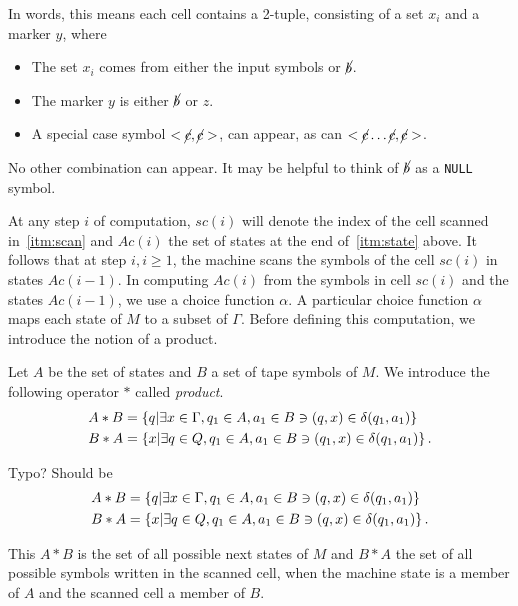 \begin{aside}
In words, this means each cell contains a 2-tuple, consisting of a set ${x_i}$ and a marker $y$, 
where
\begin{itemize}
    \item The set $x_i$ comes from either the input symbols or $\cancel{b}$.
    \item The marker $y$ is either $\cancel{b}$ or $z$.
    \item A special case symbol $<\cancel{c}, \cancel{c}>$, can appear, as can
    $<{\cancel{c} \ldots \cancel{c}}, \cancel{c}>$.
\end{itemize}

No other combination can appear.
It may be helpful to think of $\cancel{b}$ as a \verb|NULL| symbol.
\end{aside}


At any step $i$ of computation, $sc(i)$ will denote the index of the cell
scanned in~\ref{itm:scan} and $Ac(i)$ the set of
states at the end of~\ref{itm:state} above.
It follows that at step $i, i\geq 1$, the machine scans the
symbols of the cell $sc(i)$ in states $Ac(i-1)$.
In computing $Ac(i)$ from the symbols in cell
$sc(i)$ and the states $Ac(i-1)$, we use a choice function $\alpha$.
A particular choice function
$\alpha$ maps each state of $M$ to a subset of $\Gamma$.
Before defining this computation, we introduce
the notion of a product.

Let $A$ be the set of states and $B$ a set of tape symbols of $M$.
We introduce the following
operator $*$ called \emph{product}.
\begin{align*}
    A*B &= \left\{q|\exists x \in \Gamma, q_1 \in A, a_1 \in B \ni (q,x) \in \delta(q_1, a_1)\right\}\\
    B*A &= \left\{x|\exists q \in Q, q_1 \in A, a_1 \in B \ni (q_1,x) \in
    \delta(q_1, a_1)\right\}.
\end{align*}
\begin{error}
Typo?
Should be
\begin{align*}
    A*B &= \left\{q|\exists x \in \Gamma, q_1 \in A, a_1 \in B \ni (q,x) \in \delta(q_1, a_1)\right\}\\
    B*A &= \left\{x|\exists q \in Q, q_1 \in A, a_1 \in B \ni (q,x) \in
    \delta(q_1, a_1)\right\}.
\end{align*}
\end{error}
This $A*B$ is the set of all possible next states of $M$ and $B*A$ the set of all possible symbols
written in the scanned cell, when the machine state is a member of $A$ and the scanned cell a member
of $B$.

